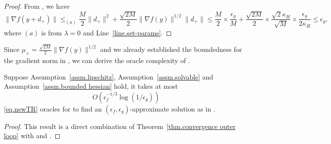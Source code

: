\documentclass{article}
\begin{document}
\begin{proof}
    From , we have
    \begin{equation*}
        \|\nabla f(y+d_+)\| \leq_{(a)} \frac{M}{2}\|d_+\|^2 + \frac{\sqrt{2M}}{2}\|\nabla f(y)\|^{1/2}\|d_+\|   \leq \frac{M}{2}\times \frac{\epsilon_g}{M}+\frac{\sqrt{2M}}{2}\times\frac{\sqrt{2}\kappa_H}{\sqrt{M}}\times\frac{\epsilon_g}{2\kappa_H}  \leq \epsilon_g,
    \end{equation*}
    where $(a)$ is from $\lambda=0$ and Line~\ref{line.set-params}.
\end{proof}

Since $\mu_+ = \frac{\sqrt{2M}}{2}\|\nabla f(y)\|^{1/2}$ and we already established the boundedness for the gradient norm in , we can derive the oracle complexity of .
\begin{theorem}
    \label{thm.total complexity newton}
    Suppose Assumption~\ref{assm.lipschitz}, Assumption~\ref{assm.solvable} and Assumption~\ref{assm.bounded hessian} hold, it takes at most
    \begin{equation}\label{eq.total complexity newton}
        O\left (\epsilon_f^{-1/3}\log \left(1/\epsilon_g\right)\right)
    \end{equation}
    \ref{eq.newTR} oracles for  to find an $(\epsilon_f,\epsilon_g)$-approximate solution as in .
\end{theorem}
\begin{proof}
    This result is a direct combination of Theorem~\ref{thm.convergence outer loop} with  and .
\end{proof}
\end{document}

